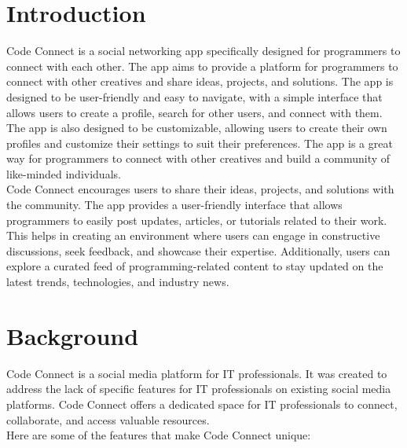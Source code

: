 \documentclass{article}
\begin{document}
\section{Introduction}


Code Connect is a social networking app specifically 
designed for programmers to connect with each other. 
The app aims to provide a platform for programmers to connect with other creatives and share ideas, projects, and solutions. The app is designed to be 
user-friendly and easy to navigate, with a simple interface that allows users to create a profile, 
search for other users, and connect with them. 
The app is also designed to be customizable, allowing users to create their own profiles and customize their settings to suit their preferences. The app is a great way for programmers
 to connect with other creatives and build a community of like-minded individuals.\\

 Code Connect encourages users to share their ideas, projects, and solutions with the community. The app provides a user-friendly interface that allows programmers to easily post updates, articles, or tutorials related to their work. This helps in creating an environment where users can engage in constructive discussions, seek feedback, and showcase their expertise. Additionally, users can explore a curated feed of programming-related content to stay updated on the latest trends, technologies, and industry news.

\section{Background}
Code Connect is a social media platform for IT professionals. It was created to address the lack of specific features for IT professionals on existing social media platforms. Code Connect offers a dedicated space for IT professionals to connect, collaborate, and access valuable resources.\\
Here are some of the features that make Code Connect unique:\\
\end{document}
